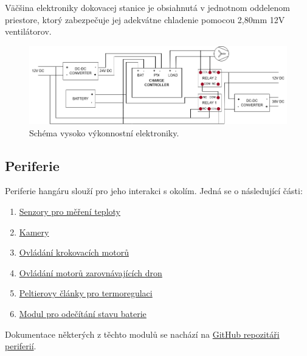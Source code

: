 \documentclass[a4paper]{article}
\begin{document}
        \noindent
        Väčšina elektroniky dokovacej stanice je obsiahnutá v jednotnom oddelenom priestore, ktorý zabezpečuje jej adekvátne chladenie pomocou 2,80mm 12V ventilátorov.

        \begin{figure}[b]
            \centering
            \includegraphics[width=1\linewidth]{schematics/HP module(3)_final.png}
            \caption{Schéma vysoko výkonnostní elektroniky.}
            \label{fig:hp}
        \end{figure}
    
    \subsection{Periferie}
    \label{subsec:periferie}
    Periferie hangáru slouží pro jeho interakci s okolím. Jedná se o následující části:
        \begin{enumerate}
            \item \hyperref[subsub:sht]{Senzory pro měření teploty}
            \item \hyperref[subsub:cams]{Kamery}
            \item \hyperref[subsub:stepmot]{Ovládání krokovacích motorů}
            \item \hyperref[subsub:dronmot]{Ovládání motorů zarovnávajících dron}
            \item \hyperref[subsub:pelt]{Peltierovy články pro termoregulaci}
            \item \hyperref[subsub:bat]{Modul pro odečítání stavu baterie}
        \end{enumerate}

    Dokumentace některých z těchto modulů se nachází na \href{https://github.com/BUT-DRONE-RESEARCH-CENTER/peripherals_hangar}{GitHub repozitáři periferií}.
\end{document}
